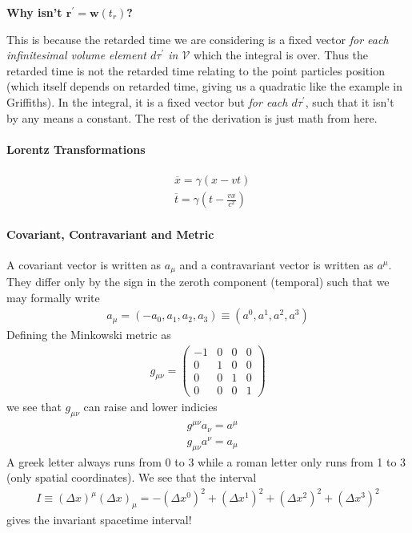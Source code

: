 \textbf{Why isn't \(\mathbf{r}^{\prime} = \mathbf{w}(t_r)\)?} 

This is because the retarded time we are considering is a fixed vector \textit{for each infinitesimal volume element \(d \tau ^{\prime} \) in \(\mathcal{V}\)} which the integral is over. Thus the retarded time is not the retarded time relating to the point particles position (which itself depends on retarded time, giving us a quadratic like the example in Griffiths). In the integral, it is a fixed vector but \textit{for each \(d \tau ^{\prime} \)}, such that it isn't by any means a constant. The rest of the derivation is just math from here.

\paragraph{Lorentz Transformations} \begin{align*}
    &\overline{x} = \gamma (x - vt)\\
    &\overline{t} = \gamma (t - \frac{vx}{c^{2}})
\end{align*}

\paragraph{Covariant, Contravariant and Metric}
A covariant vector is written as \(a_\mu\) and a contravariant vector is written as \(a^{\mu}\). They differ only by the sign in the zeroth component (temporal) such that we may formally write \begin{align*}
    a_\mu = (-a_0, a_1, a_2, a_3) \equiv (a^0, a^1, a^2, a^3)
\end{align*} 
Defining the Minkowski metric as \begin{align*}
    g_{\mu \nu} = \begin{pmatrix}
        -1 & 0 & 0 & 0\\
        0 & 1 & 0 & 0\\
        0 & 0 & 1 & 0\\
        0 & 0 & 0 & 1
    \end{pmatrix}
\end{align*}
we see that \(g_{\mu  \nu }\) can raise and lower indicies \begin{align*}
    &g^{\mu \nu }a_\nu  = a^{\mu} \\
    & g_{\mu \nu } a^{\nu } = a_\mu 
\end{align*}
A greek letter always runs from 0 to 3 while a roman letter only runs from 1 to 3 (only spatial coordinates). We see that the interval \begin{align*}
    I \equiv (\Delta x)^{\mu}(\Delta x)_{\mu} = - (\Delta x^0)^{2} + (\Delta x^1)^{2} + (\Delta x^2)^{2} + (\Delta x^3)^{2} 
\end{align*}
gives the invariant spacetime interval!

